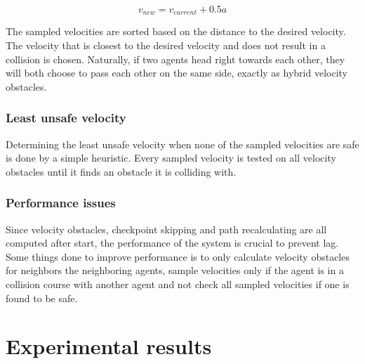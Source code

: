 \documentclass[a4paper,12pt]{article}
\begin{document}
\begin{multicols}{2}
\begin{equation} \label{eq:sample}
    v_{new} = v_{current} + 0.5a
\end{equation}

The sampled velocities are sorted based on the distance to the desired velocity. The velocity that is closest to the desired velocity and does not result in a collision is chosen. Naturally, if two agents head right towards each other, they will both choose to pass each other on the same side, exactly as hybrid velocity obstacles.


\subsubsection*{Least unsafe velocity}  %
Determining the least unsafe velocity when none of the sampled velocities are safe is done by a simple heuristic. Every sampled velocity is tested on all velocity obstacles until it finds an obstacle it is colliding with.


\subsubsection*{Performance issues}
Since velocity obstacles, checkpoint skipping and path recalculating are all computed after start, the performance of the system is crucial to prevent lag. Some things done to improve performance is to only calculate velocity obstacles for neighbors the neighboring agents, sample velocities only if the agent is in a collision course with another agent and not check all sampled velocities if one is found to be safe.








\section{Experimental results}
\label{sec:exps}


\end{multicols}
\end{document}
